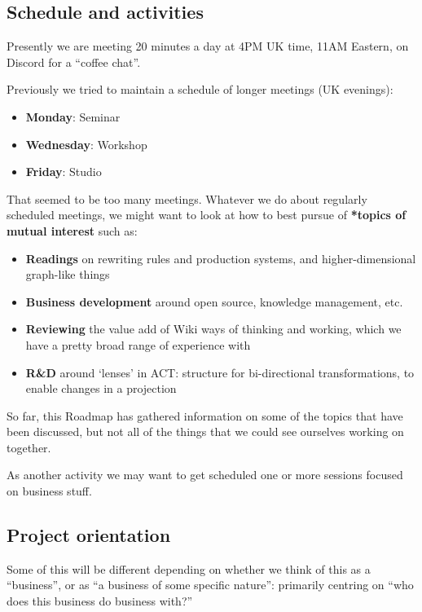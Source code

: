 \documentclass[11pt]{article}
\begin{document}
\subsection{Schedule and activities}
\label{sec:orgb8dec1c}

Presently we are meeting 20 minutes a day at 4PM UK time, 11AM
Eastern, on Discord for a “coffee chat”.

Previously we tried to maintain a schedule of longer meetings (UK
evenings):

\begin{itemize}
\item \textbf{Monday}: Seminar
\item \textbf{Wednesday}: Workshop
\item \textbf{Friday}: Studio
\end{itemize}

That seemed to be too many meetings.  Whatever we do about regularly
scheduled meetings, we might want to look at how to best pursue of
\textbf{*topics of mutual interest} such as:

\begin{itemize}
\item \textbf{Readings} on rewriting rules and production systems, and higher-dimensional graph-like things
\item \textbf{Business development} around open source, knowledge management, etc.
\item \textbf{Reviewing} the value add of Wiki ways of thinking and working, which we have a pretty broad range of experience with
\item \textbf{R\&D} around ‘lenses’ in ACT: structure for bi-directional transformations, to enable changes in a projection
\end{itemize}

So far, this Roadmap has gathered information on some of the topics
that have been discussed, but not all of the things that we could see
ourselves working on together.

As another activity we may want to get scheduled one or more sessions
focused on business stuff.

\subsection{Project orientation}
\label{sec:orgf995356}

Some of this will be different depending on whether we think of this
as a “business”, or as “a business of some specific nature”: primarily
centring on “who does this business do business with?”
\end{document}
